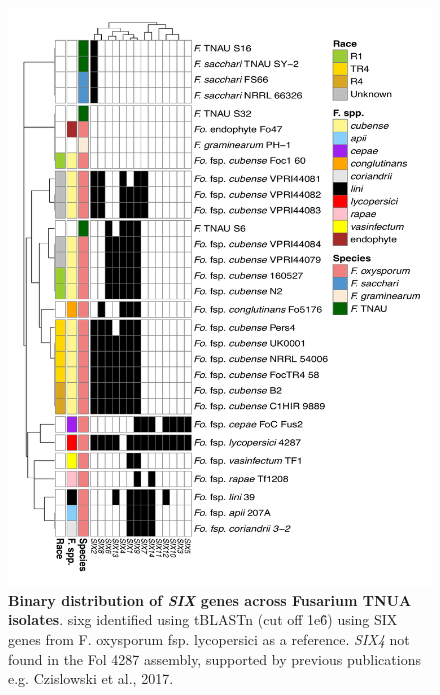 \bigskip
\begin{figure}[htp!]
  \centering
  \includegraphics[width=15cm]{Figures/SixTNAU-Heatmap_edited.pdf}
  \caption[Binary distribution of \textit{SIX} genes across Fusarium TNUA isolates]{\textbf{Binary distribution of \textit{SIX} genes across Fusarium TNUA isolates}. \acl{sixg} identified using tBLASTn (cut off 1\-e\^6) using SIX genes from F. oxysporum fsp. lycopersici as a reference. \textit{SIX4} not found in the \ac{Fol} 4287 assembly, supported by previous publications e.g. Czislowski et al., 2017.}
  \label{fig:SixTNAU}
\end{figure}
\bigskip

